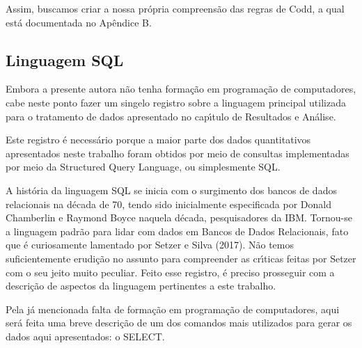 \documentclass[
12pt,		%
openright,	%
twoside,  %
a4paper,			%
chapter=TITLE,		%
english,			%
french,				%
spanish,			%
brazil				%
]{USPSC-classe/USPSC}
\begin{document}
Assim, buscamos criar a nossa pr\'opria compreens\~ao das regras de Codd, a qual est\'a documentada no Ap\^endice B.










\subsection[Linguagem SQL]{Linguagem SQL}\label{Linguagem SQL}
Embora a presente autora n\~ao tenha forma\c{c}\~ao em programa\c{c}\~ao de computadores, cabe neste ponto fazer um singelo registro sobre a linguagem principal utilizada para o tratamento de dados apresentado no cap\'{\i}tulo de \textquotedbl Resultados e An\'alise\textquotedbl .










Este registro \'e necess\'ario porque a maior parte dos dados quantitativos apresentados neste trabalho foram obtidos por meio de consultas implementadas por meio da Structured Query Language, ou simplesmente SQL.










A hist\'oria da linguagem SQL se inicia com o surgimento dos bancos de dados relacionais na d\'ecada de 70, tendo sido inicialmente especificada por Donald Chamberlin e Raymond Boyce naquela d\'ecada, pesquisadores da IBM. Tornou-se a linguagem padr\~ao para lidar com dados em Bancos de Dados Relacionais, fato que \'e curiosamente lamentado por  Setzer e Silva (2017). N\~ao temos suficientemente erudi\c{c}\~ao no assunto para compreender as cr\'{\i}ticas feitas por Setzer com o seu jeito muito peculiar. Feito esse registro, \'e preciso prosseguir com a descri\c{c}\~ao de aspectos da linguagem pertinentes a este trabalho.










Pela j\'a mencionada falta de forma\c{c}\~ao em programa\c{c}\~ao de computadores, aqui ser\'a feita uma breve descri\c{c}\~ao de um dos comandos mais utilizados para gerar os dados aqui apresentados: o SELECT.
\end{document}
